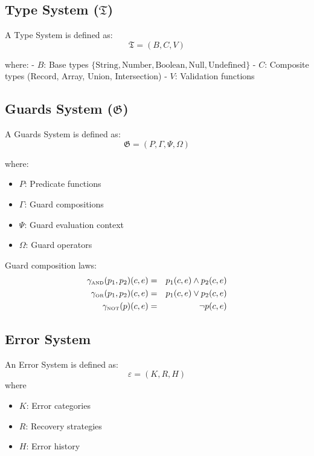 \documentclass[10pt]{article}
\begin{document}
\subsection{Type System ($\mathfrak{T}$)}

A Type System is defined as:
$$\mathfrak{T} = (B, C, V)$$

where:
- $B$: Base types $\{\text{String}, \text{Number}, \text{Boolean}, \text{Null}, \text{Undefined}\}$
- $C$: Composite types (Record, Array, Union, Intersection)
- $V$: Validation functions

\subsection{Guards System ($\mathfrak{G}$)}

A Guards System is defined as:
\[
\mathfrak{G} = (P, \Gamma, \Psi, \Omega)
\]

where:
\begin{itemize}[leftmargin=2em]
\item $P$: Predicate functions
\item $\Gamma$: Guard compositions
\item $\Psi$: Guard evaluation context
\item $\Omega$: Guard operators
\end{itemize}

Guard composition laws:
\begin{eqnarray}
\gamma_{\text{\tiny AND}}(p_1, p_2)(c, e) &=& p_1(c, e) \wedge p_2(c, e) \\
\gamma_{\text{\tiny OR}}(p_1, p_2)(c, e) &=& p_1(c, e) \vee p_2(c, e) \\
\gamma_{\text{\tiny NOT}}(p)(c, e) &=& \neg p(c, e)
\end{eqnarray}

\subsection{Error System}

An Error System is defined as:
$$\varepsilon = (K, R, H)$$
where
\begin{itemize}[leftmargin=2em]
\item $K$: Error categories
\item $R$: Recovery strategies
\item $H$: Error history
\end{itemize}
\end{document}
